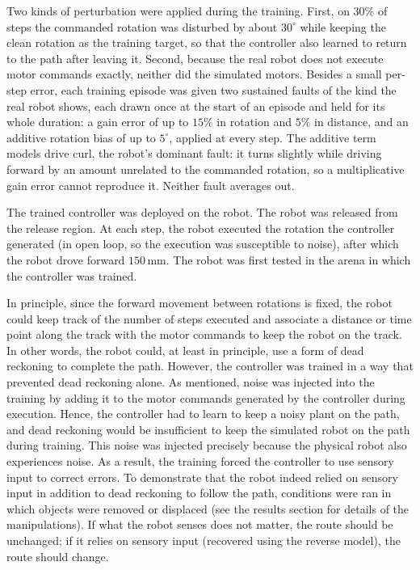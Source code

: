 \documentclass[11pt]{article}
\newcommand{\dgm}{^{\circ}}
\begin{document}
Two kinds of perturbation were applied during the training. First, on $30\%$ of steps the commanded rotation was disturbed by about $30\dgm$ while keeping the clean rotation as the training target, so that the controller also learned to return to the path after leaving it. Second, because the real robot does not execute motor commands exactly, neither did the simulated motors. Besides a small per-step error, each training episode was given two sustained faults of the kind the real robot shows, each drawn once at the start of an episode and held for its whole duration: a gain error of up to $15\%$ in rotation and $5\%$ in distance, and an additive rotation bias of up to $5^{\circ}$, applied at every step. The additive term models drive curl, the robot's dominant fault: it turns slightly while driving forward by an amount unrelated to the commanded rotation, so a multiplicative gain error cannot reproduce it. Neither fault averages out.

The trained controller was deployed on the robot. The robot was released from the release region. At each step, the robot executed the rotation the controller generated (in open loop, so the execution was susceptible to noise), after which the robot drove forward $150$\,mm. The robot was first tested in the arena in which the controller was trained.

In principle, since the forward movement between rotations is fixed, the robot could keep track of the number of steps executed and associate a distance or time point along the track with the motor commands to keep the robot on the track. In other words, the robot could, at least in principle, use a form of dead reckoning to complete the path. However, the controller was trained in a way that prevented dead reckoning alone. As mentioned, noise was injected into the training by adding it to the motor commands generated by the controller during execution. Hence, the controller had to learn to keep a noisy plant on the path, and dead reckoning would be insufficient to keep the simulated robot on the path during training. This noise was injected precisely because the physical robot also experiences noise. As a result, the training forced the controller to use sensory input to correct errors. To demonstrate that the robot indeed relied on sensory input in addition to dead reckoning to follow the path, conditions were ran in which  objects were removed or displaced (see the results section for details of the manipulations). If what the robot senses does not matter, the route should be unchanged; if it relies on sensory input (recovered using the reverse model), the route should change.
\end{document}
